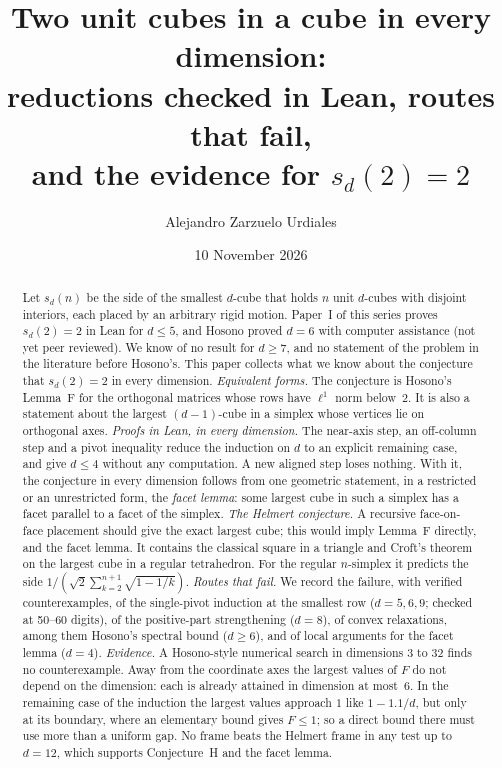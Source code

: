 \documentclass[11pt,a4paper]{article}
\title{Two unit cubes in a cube in every dimension:\\
reductions checked in Lean, routes that fail,\\ and the evidence for $s_d(2)=2$}
\author{Alejandro Zarzuelo Urdiales}
\date{10 November 2026}
\begin{document}
\maketitle

\begin{abstract}
Let $s_d(n)$ be the side of the smallest $d$-cube that holds $n$ unit $d$-cubes with disjoint interiors, each placed by an arbitrary rigid motion. Paper~I of this series proves $s_d(2)=2$ in Lean for $d\le5$, and Hosono proved $d=6$ with computer assistance (not yet peer reviewed). We know of no result for $d\ge7$, and no statement of the problem in the literature before Hosono's. This paper collects what we know about the conjecture that $s_d(2)=2$ in every dimension. \emph{Equivalent forms.} The conjecture is Hosono's Lemma~F for the orthogonal matrices whose rows have $\ell^1$ norm below~$2$. It is also a statement about the largest $(d-1)$-cube in a simplex whose vertices lie on orthogonal axes. \emph{Proofs in Lean, in every dimension.} The near-axis step, an off-column step and a pivot inequality reduce the induction on $d$ to an explicit remaining case, and give $d\le4$ without any computation. A new aligned step loses nothing. With it, the conjecture in every dimension follows from one geometric statement, in a restricted or an unrestricted form, the \emph{facet lemma}: some largest cube in such a simplex has a facet parallel to a facet of the simplex. \emph{The Helmert conjecture.} A recursive face-on-face placement should give the exact largest cube; this would imply Lemma~F directly, and the facet lemma. It contains the classical square in a triangle and Croft's theorem on the largest cube in a regular tetrahedron. For the regular $n$-simplex it predicts the side $1/(\sqrt2\sum_{k=2}^{n+1}\sqrt{1-1/k})$. \emph{Routes that fail.} We record the failure, with verified counterexamples, of the single-pivot induction at the smallest row ($d=5,6,9$; checked at 50--60 digits), of the positive-part strengthening ($d=8$), of convex relaxations, among them Hosono's spectral bound ($d\ge6$), and of local arguments for the facet lemma ($d=4$). \emph{Evidence.} A Hosono-style numerical search in dimensions $3$ to $32$ finds no counterexample. Away from the coordinate axes the largest values of $F$ do not depend on the dimension: each is already attained in dimension at most~$6$. In the remaining case of the induction the largest values approach $1$ like $1-1.1/d$, but only at its boundary, where an elementary bound gives $F\le1$; so a direct bound there must use more than a uniform gap. No frame beats the Helmert frame in any test up to $d=12$, which supports Conjecture~H and the facet lemma.
\end{abstract}
\end{document}
